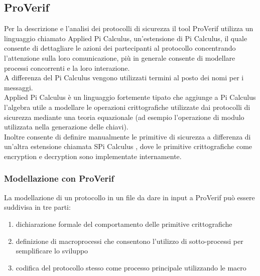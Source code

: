 \subsection{ProVerif}\label{sub:pro}
Per la descrizione e l'analisi dei protocolli di sicurezza il tool ProVerif utilizza un linguaggio chiamato Applied Pi Calculus, un'estensione di Pi Calculus, il quale consente di dettagliare le azioni dei partecipanti al protocollo concentrando l'attenzione sulla loro comunicazione, più in generale consente di modellare processi concorrenti e la loro interazione.\\
A differenza del Pi Calculus vengono utilizzati termini al posto dei nomi per i messaggi.\\
Applied Pi Calculus \cite{AF16} è un linguaggio fortemente tipato che aggiunge a  Pi Calculus l'algebra utile a modellare le operazioni crittografiche utilizzate dai protocolli di sicurezza mediante una teoria equazionale (ad esempio l'operazione di modulo utilizzata nella generazione delle chiavi).\\
Inoltre consente di definire manualmente le primitive di sicurezza a differenza di un'altra estensione chiamata SPi Calculus \cite{AG97}, dove le primitive crittografiche come encryption e decryption sono implementate internamente.\\

\subsubsection*{Modellazione con ProVerif}

La modellazione di un protocollo in un file da dare in input a ProVerif può essere suddivisa in tre parti:
\begin{enumerate}
    \item dichiarazione formale del comportamento delle primitive crittografiche
    \item definizione di macroprocessi che consentono l'utilizzo di sotto-processi per semplificare lo sviluppo
    \item codifica del protocollo stesso come processo principale utilizzando le macro
\end{enumerate}

